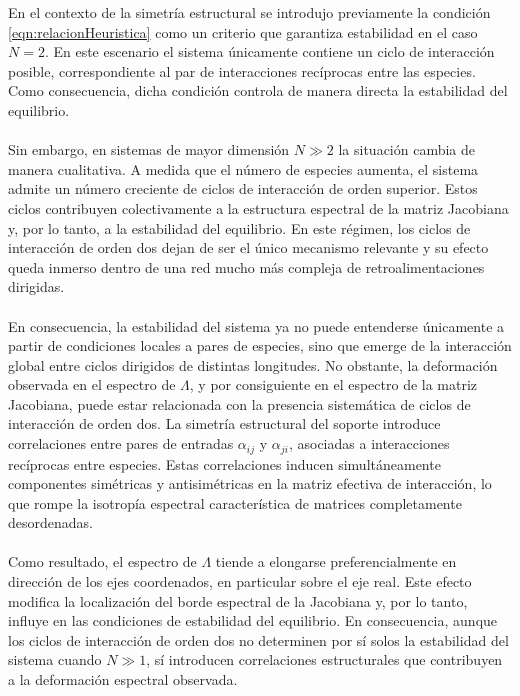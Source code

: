 En el contexto de la simetría estructural se introdujo previamente la condición \eqref{eqn:relacionHeuristica} como un criterio que garantiza estabilidad en el caso  $N=2$. En este escenario el sistema únicamente contiene un ciclo de interacción posible, correspondiente al par de interacciones recíprocas entre las especies. Como consecuencia, dicha condición controla de manera directa la estabilidad del equilibrio.\\
\\
Sin embargo, en sistemas de mayor dimensión $N\gg 2$ la situación cambia de manera cualitativa.  A medida que el número de especies aumenta, el sistema admite un número creciente de ciclos de interacción de orden superior. Estos ciclos contribuyen colectivamente a la estructura espectral de la matriz Jacobiana y, por lo tanto, a la estabilidad del equilibrio. En este régimen, los ciclos de interacción de orden dos dejan de ser el único mecanismo  relevante y su efecto queda inmerso dentro de una red mucho más compleja de retroalimentaciones dirigidas.\\
\\
En consecuencia, la estabilidad del sistema ya no puede entenderse únicamente a partir de condiciones locales a pares de especies, sino que emerge de la interacción global entre ciclos dirigidos de distintas longitudes. No obstante, la deformación observada en el espectro de $\Lambda$, y por consiguiente en el espectro de la matriz Jacobiana, puede estar relacionada con la presencia sistemática de ciclos de interacción de orden dos. La simetría estructural del soporte introduce correlaciones entre pares de entradas $\alpha_{ij}$ y $\alpha_{ji}$, asociadas a interacciones recíprocas entre especies. Estas correlaciones inducen simultáneamente componentes simétricas y antisimétricas en la matriz efectiva de interacción, lo que rompe la isotropía espectral característica de matrices completamente desordenadas. 
\\
\\
Como resultado, el espectro de $\Lambda$ tiende a elongarse preferencialmente en dirección de los ejes coordenados, en particular sobre el eje real. Este efecto modifica la localización del borde espectral de la Jacobiana y, por lo tanto, influye en las condiciones de estabilidad del equilibrio. En consecuencia, aunque los ciclos de interacción de orden dos no determinen por sí solos la estabilidad del sistema cuando $N\gg1$, sí introducen correlaciones estructurales que contribuyen a la deformación espectral observada.
\\
